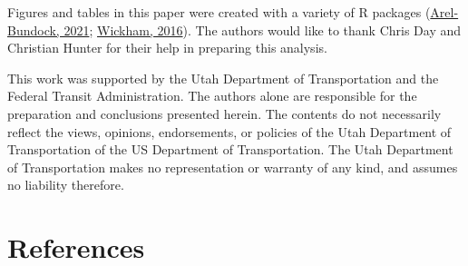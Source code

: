 \documentclass[3p, authoryear, review]{elsarticle} %
\begin{document}
Figures and tables in this paper were created with a variety of R
packages (\protect\hyperlink{ref-R-modelsummary}{Arel-Bundock, 2021}; \protect\hyperlink{ref-ggplot22016}{Wickham, 2016}). The authors would like to thank
Chris Day and Christian Hunter for their help in preparing this analysis.

This work was supported by the Utah Department of Transportation and the
Federal Transit Administration. The authors alone are responsible for the
preparation and conclusions presented herein. The contents do not necessarily
reflect the views, opinions, endorsements, or policies of the Utah Department of
Transportation of the US Department of Transportation. The Utah Department of
Transportation makes no representation or warranty of any kind, and assumes no
liability therefore.

\hypertarget{references}{%
\section*{References}\label{references}}
\end{document}
